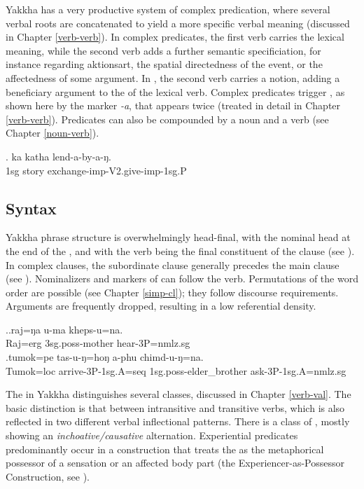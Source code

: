 Yakkha has a very productive system of complex predication, where several verbal roots are concatenated to yield a more specific verbal meaning (discussed in Chapter \ref{verb-verb}). In complex predicates, the first verb carries the lexical meaning, while the second verb adds a further semantic specificiation, for instance regarding aktionsart, the spatial directedness of the event, or the affectedness of some argument. In \Next, the second verb carries a  notion, adding a beneficiary argument to the  of the lexical verb. Complex predicates trigger , as shown here by the  marker \emph{-a}, that appears twice (treated in detail in Chapter \ref{verb-verb}). Predicates can also be compounded by a noun and a verb  (see Chapter \ref{noun-verb}).
 	
	\exg. ka katha lend-a-by-a-ŋ.\\
	{\sc 1sg} story  exchange{\sc -imp-V2.give-imp-1sg.P}\\



\subsection{Syntax}

Yakkha phrase structure is overwhelmingly  head-final, with the nominal head at the end of the , and with the verb being the final constituent of the clause (see \Next[a]). In complex clauses, the subordinate clause generally precedes the main clause (see \Next[b]). Nominalizers and markers of  can follow the verb. Permutations of the word order are possible (see Chapter \ref{simp-cl}); they follow discourse requirements. Arguments are frequently dropped, resulting in a low referential density. 

\ex.\ag.raj=ŋa u-ma  kheps-u=na.\\
Raj{\sc =erg} {\sc 3sg.poss-}mother hear{\sc [pst]-3P=nmlz.sg}\\
\bg.tumok=pe tas-u-ŋ=hoŋ a-phu chimd-u-ŋ=na.\\
Tumok{\sc =loc} arrive{\sc [pst]-3P-1sg.A=seq} {\sc 1sg.poss-}elder\_brother ask{\sc [pst]-3P-1sg.A=nmlz.sg}\\

The  in Yakkha distinguishes several  classes, discussed in Chapter \ref{verb-val}. The basic distinction is that between intransitive and transitive verbs, which is also reflected in two different verbal inflectional patterns. There is a class of , mostly showing an \emph{inchoative/causative} alternation. Experiential predicates predominantly occur in a construction that treats the  as the metaphorical possessor of a sensation or an affected body part (the Experiencer-as-Possessor Construction, see \Next).

